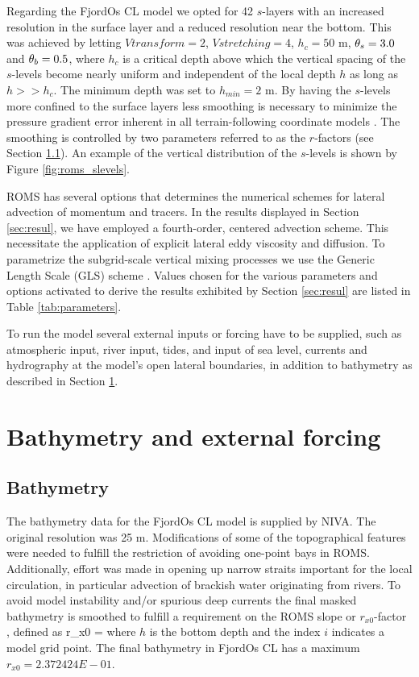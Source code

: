 Regarding the FjordOs CL model we opted for 42 $s$-layers with an increased resolution in the surface layer and a reduced resolution near the bottom. This was achieved by letting $Vtransform=2$, $Vstretching=4$, $h_c = 50$ m, $\theta_s = 3.0$ and $\theta_b = 0.5$, where $h_c$ is a critical depth above which the vertical spacing of the $s$-levels become nearly uniform and independent of the local depth $h$ as long as $h >> h_c$. The minimum depth was set to $h_{min}=2$ m. By having the $s$-levels more confined to the surface layers less smoothing is necessary to minimize the pressure gradient error inherent in all terrain-following coordinate models \citep{haney:1991}. The smoothing is controlled by two parameters referred to as the $r$-factors (see Section \ref{subsec:bathy}). An example of the vertical distribution of the $s$-levels is shown by Figure \ref{fig:roms_slevels}.


ROMS has several options that determines the numerical schemes for lateral advection of momentum and tracers. In the results displayed in Section \ref{sec:resul}, we have employed a fourth-order, centered advection scheme. This necessitate the application of explicit lateral eddy viscosity and diffusion. To parametrize the subgrid-scale vertical mixing processes we use the Generic Length Scale (GLS) scheme  \citep{umlau:burch:2003}. Values chosen for the various parameters and options activated to derive the results exhibited by Section \ref{sec:resul} are listed in Table \ref{tab:parameters}. 


To run the model several external inputs or forcing have to be supplied, such as atmospheric input, river input, tides, and input of sea level, currents and hydrography at the model's open lateral boundaries, in addition to bathymetry as described in Section \ref{sec:forcing}.   

\section{Bathymetry and external forcing}
\label{sec:forcing}
\subsection{Bathymetry}
\label{subsec:bathy}
The bathymetry data for the FjordOs CL model is supplied by NIVA. The original resolution was 25 m. Modifications of some of the topographical features were needed to fulfill the restriction of avoiding one-point bays in ROMS. Additionally, effort was made in opening up narrow straits important for the local circulation, in particular advection of brackish water originating from rivers. To avoid model instability and/or spurious deep currents the final masked bathymetry is smoothed to fulfill a requirement on the ROMS slope or $r_{x0}$-factor \citep{beckm:haidv:1993}, defined as
\be
 r_{x0} = 
\ee
where $h$ is the bottom depth and the index $i$ indicates a model grid point. The final bathymetry in FjordOs CL has a maximum $r_{x0} = 2.372424E-01$.

